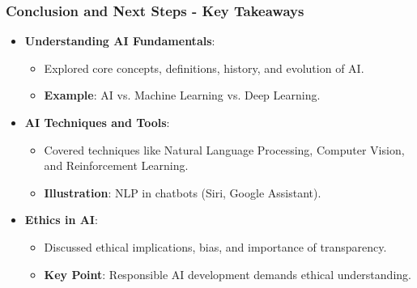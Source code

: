 \documentclass[aspectratio=169]{beamer}
\begin{document}
\begin{frame}[fragile]
    \frametitle{Conclusion and Next Steps - Key Takeaways}
    
    \begin{itemize}
        \item \textbf{Understanding AI Fundamentals}:
        \begin{itemize}
            \item Explored core concepts, definitions, history, and evolution of AI.
            \item \textbf{Example}: AI vs. Machine Learning vs. Deep Learning.
        \end{itemize}
        
        \item \textbf{AI Techniques and Tools}:
        \begin{itemize}
            \item Covered techniques like Natural Language Processing, Computer Vision, and Reinforcement Learning.
            \item \textbf{Illustration}: NLP in chatbots (Siri, Google Assistant).
        \end{itemize}
        
        \item \textbf{Ethics in AI}:
        \begin{itemize}
            \item Discussed ethical implications, bias, and importance of transparency.
            \item \textbf{Key Point}: Responsible AI development demands ethical understanding.
        \end{itemize}
    \end{itemize}
\end{frame}
\end{document}
